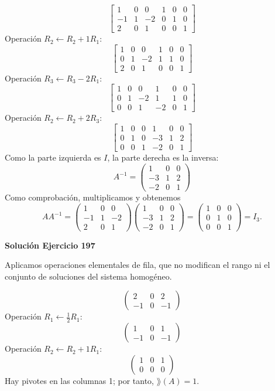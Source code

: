 \[
\left[\begin{array}{rrr|rrr}1&0&0&1&0&0\\-1&1&-2&0&1&0\\2&0&1&0&0&1\end{array}\right]
\]
Operación $R_{2}\leftarrow R_{2}+1R_{1}$:
\[
\left[\begin{array}{rrr|rrr}1&0&0&1&0&0\\0&1&-2&1&1&0\\2&0&1&0&0&1\end{array}\right]
\]
Operación $R_{3}\leftarrow R_{3}-2R_{1}$:
\[
\left[\begin{array}{rrr|rrr}1&0&0&1&0&0\\0&1&-2&1&1&0\\0&0&1&-2&0&1\end{array}\right]
\]
Operación $R_{2}\leftarrow R_{2}+2R_{3}$:
\[
\left[\begin{array}{rrr|rrr}1&0&0&1&0&0\\0&1&0&-3&1&2\\0&0&1&-2&0&1\end{array}\right]
\]
Como la parte izquierda es $I$, la parte derecha es la inversa:
\[
\boxed{A^{-1}=\begin{pmatrix}1&0&0\\-3&1&2\\-2&0&1\end{pmatrix}}
\]
Como comprobación, multiplicamos y obtenemos
\[
AA^{-1}=\begin{pmatrix}1&0&0\\-1&1&-2\\2&0&1\end{pmatrix}\begin{pmatrix}1&0&0\\-3&1&2\\-2&0&1\end{pmatrix}=\begin{pmatrix}1&0&0\\0&1&0\\0&0&1\end{pmatrix}=I_{3}.
\]

\par\bigskip\noindent\textbf{Solución Ejercicio 197}\par\nobreak
Aplicamos operaciones elementales de fila, que no modifican el rango ni el conjunto de soluciones del sistema homogéneo.

\[
\begin{pmatrix}2&0&2\\-1&0&-1\end{pmatrix}
\]
Operación $R_{1}\leftarrow \frac{1}{2}R_{1}$:
\[
\begin{pmatrix}1&0&1\\-1&0&-1\end{pmatrix}
\]
Operación $R_{2}\leftarrow R_{2}+1R_{1}$:
\[
\begin{pmatrix}1&0&1\\0&0&0\end{pmatrix}
\]
Hay pivotes en las columnas 1; por tanto, $\boxed{\rang(A)=1}$.

